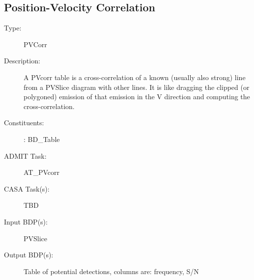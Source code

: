 \subsection{Position-Velocity Correlation}
\begin{description}
\item[Type:] PVCorr
\item[Description:]

A PVcorr table is a cross-correlation of a known (usually also strong)
line from a PVSlice diagram with other lines. It is like dragging the
clipped (or polygoned) emission of that emission in the V direction
and computing the cross-correlation. 

\item[Constituents:]: BD\_Table

\item[ADMIT Task:]  AT\_PVcorr

\item[CASA Task(s):] TBD

\item[Input BDP(s):] PVSlice

\item[Output BDP(s):]
Table of potential detections, columns are: frequency, S/N
\end{description}

